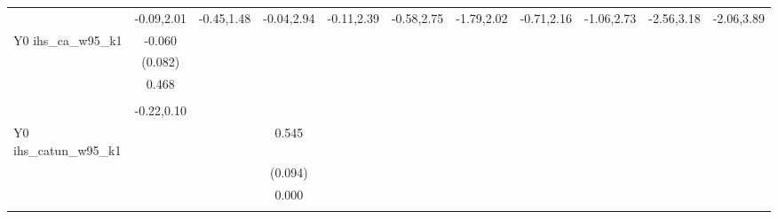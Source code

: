 \begin{table}[!h]
\begin{adjustbox}{width=\columnwidth,center}
\begin{tabular}{l*{8}{c}}
                    &  -0.09,2.01         &  -0.45,1.48         &  -0.04,2.94         &  -0.11,2.39         &  -0.58,2.75         &  -1.79,2.02         &  -0.71,2.16         &  -1.06,2.73         &  -2.56,3.18         &  -2.06,3.89         \\
Y0 ihs\_ca\_w95\_k1    &      -0.060         &                     &                     &                     &                     &                     &                     &                     &                     &                     \\
                    &     (0.082)         &                     &                     &                     &                     &                     &                     &                     &                     &                     \\
                    &       0.468         &                     &                     &                     &                     &                     &                     &                     &                     &                     \\
                    &                     &                     &                     &                     &                     &                     &                     &                     &                     &                     \\
                    &  -0.22,0.10         &                     &                     &                     &                     &                     &                     &                     &                     &                     \\
Y0 ihs\_catun\_w95\_k1 &                     &                     &       0.545\sym{***}&                     &                     &                     &                     &                     &                     &                     \\
                    &                     &                     &     (0.094)         &                     &                     &                     &                     &                     &                     &                     \\
                    &                     &                     &       0.000         &                     &                     &                     &                     &                     &                     &                     \\
                    &                     &                     &                     &                     &                     &                     &                     &                     &                     &                     \\

\end{tabular}
\end{adjustbox}
\end{table}
